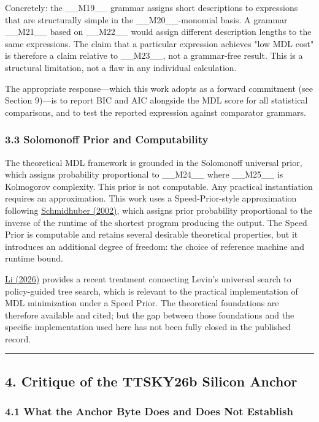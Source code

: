 Concretely: the \_\_M19\_\_ grammar assigns short descriptions to expressions that are structurally simple in the \_\_M20\_\_-monomial basis. A grammar \_\_M21\_\_ based on \_\_M22\_\_ would assign different description lengths to the same expressions. The claim that a particular expression achieves "low MDL cost" is therefore a claim relative to \_\_M23\_\_, not a grammar-free result. This is a structural limitation, not a flaw in any individual calculation.

The appropriate response---which this work adopts as a forward commitment (see Section 9)---is to report BIC and AIC alongside the MDL score for all statistical comparisons, and to test the reported expression against comparator grammars.

\subsubsection{3.3 Solomonoff Prior and Computability}

The theoretical MDL framework is grounded in the Solomonoff universal prior, which assigns probability proportional to \_\_M24\_\_ where \_\_M25\_\_ is Kolmogorov complexity. This prior is not computable. Any practical instantiation requires an approximation. This work uses a Speed-Prior-style approximation following \href{https://doi.org/10.1007/3-540-45435-7\_15}{Schmidhuber (2002)}, which assigns prior probability proportional to the inverse of the runtime of the shortest program producing the output. The Speed Prior is computable and retains several desirable theoretical properties, but it introduces an additional degree of freedom: the choice of reference machine and runtime bound.

\href{https://doi.org/10.3390/e28040434}{Li (2026)} provides a recent treatment connecting Levin's universal search to policy-guided tree search, which is relevant to the practical implementation of MDL minimization under a Speed Prior. The theoretical foundations are therefore available and cited; but the gap between those foundations and the specific implementation used here has not been fully closed in the published record.

\noindent\rule{\textwidth}{0.4pt}

\subsection{4. Critique of the TTSKY26b Silicon Anchor}

\subsubsection{4.1 What the Anchor Byte Does and Does Not Establish}

